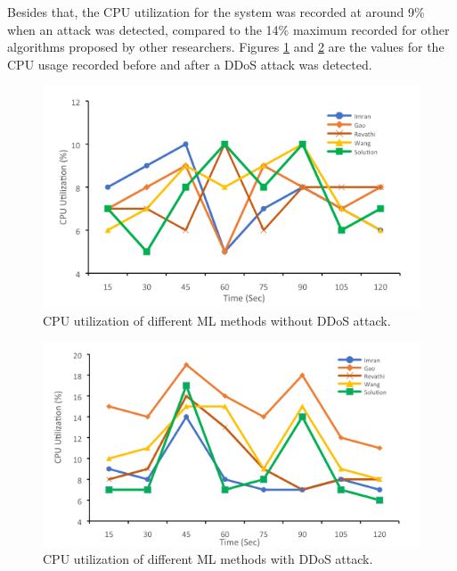 \documentclass[a4paper, 12pt]{article}
\begin{document}
Besides that, the CPU utilization for the system was recorded at around 9\% when an attack was detected, compared to the 14\% maximum recorded for other algorithms proposed by other researchers. Figures \ref{fig:cpu1} and \ref{fig:cpu2} are the values for the CPU usage recorded before and after a DDoS attack was detected.  

\begin{figure}[H]
    \centering
    \includegraphics[width=0.7\linewidth]{image-cpu1.png}
    \caption{CPU utilization of different ML methods without DDoS attack. \protect{}}
    \label{fig:cpu1}
\end{figure}

\begin{figure}[H]
    \centering
    \includegraphics[width=0.7\linewidth]{image-cpu2.png}
    \caption{CPU utilization of different ML methods with DDoS attack. \protect{}}
    \label{fig:cpu2}
\end{figure}
\end{document}
